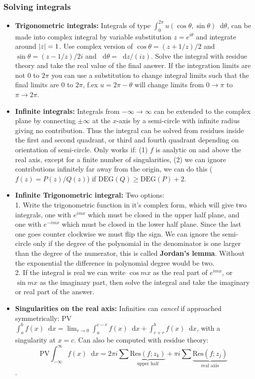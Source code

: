 \documentclass[a4paper, 10pt]{article}
\newcommand*\diff{\mathop{}\!\mathrm{d}}
\begin{document}
\begin{multicols*}{3}
\subsubsection*{Solving integrals}
\begin{itemize}
\item \textbf{Trigonometric integrals:} Integrals of type $\int_0^{2\pi} u(\cos{\theta}, \sin{\theta}) \diff \theta$, can be made into complex integral by variable substitution $z=e^{i\theta}$ and integrate around $\abs{z}=1$. Use complex version of $\cos{\theta} = (z+1/z)/2$ and $\sin{\theta}=(z-1/z)/2i$ and $\diff \theta = \diff z/(iz)$. Solve the integral with residue theory and take the real value of the final answer.
If the integration limits are not $0$ to $2\pi$ you can use a substitution to change integral limits such that the final limits are $0$ to $2\pi$, f.ex $u=2\pi-\theta$ will change limits from $0\rightarrow\pi$ to $\pi\rightarrow 2\pi$.
\item \textbf{Infinite integrals:} Integrals from $-\infty\rightarrow\infty$ can be extended to the complex plane by connecting $\pm\infty$ at the $x$-axis by a semi-circle with infinite radius giving no contribution. Thus the integral can be solved from residues inside the first and second quadrant, or third and fourth quadrant depending on orientation of semi-circle. Only works if: (1) $f$ is analytic on and above the real axis, except for a finite number of singularities, (2) we can ignore contributions infinitely far away from the origin, we can do this ($f(z)=P(z)/Q(z)$) if $\text{DEG}(Q) \geq \text{DEG}(P)+2$.
\item \textbf{Infinite Trigonometric integral:} Two options:\\1. Write the trigonometric function in it's complex form, which will give two integrals, one with $e^{imx}$ which must be closed in the upper half plane, and one with $e^{-imx}$ which must be closed in the lower half plane. Since the last one goes counter clockwise we must flip the sign. We can ignore the semi-circle only if the degree of the polynomial in the denominator is one larger than the degree of the numerator, this is called \textbf{Jordan's lemma}. Without the exponential the difference in polynomial degree would be two. \\2. If the integral is real we can write $\cos{mx}$ as the real part of $e^{imx}$, or $\sin{mx}$ as the imaginary part, then solve the integral and take the imaginary or real part of the answer.
\item \textbf{Singularities on the real axis:} Infinities can \textit{cancel} if approached symmetrically: PV$\int_a^b f(x)\diff x = \lim_{r\rightarrow 0} \int_a^{c-r} f(x)\diff x + \int_{c+r}^{b}f(x)\diff x$, with a singularity at $x=c$. Can also be computed with residue theory:
$$\text{PV}\int_{-\infty}^{\infty} f(x)\diff x = 2\pi i \sum \underbrace{\text{Res}(f; z_k)}_{\text{upper half}} + \pi i \sum \underbrace{\text{Res}(f;z_j)}_{\text{real axis}}$$.
\end{itemize}
\newpage
\begin{mdframed}

\end{mdframed}
\end{multicols*}
\end{document}
